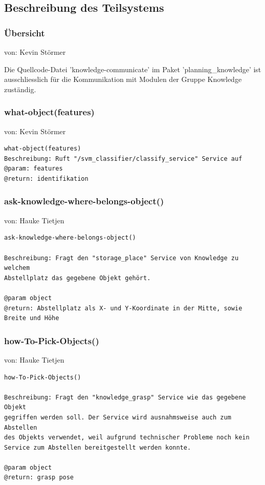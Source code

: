 \documentclass{suturo}
\makeatletter
\newcommand{\chapterauthor}[1]{%
  {\parindent0pt\vspace*{-27pt}%
  \linespread{0}\small\begin{flushright}von: #1\end{flushright}%
  \par\nobreak\vspace*{0pt}}
  \@afterheading%
}
\makeatother
\begin{document}
\subsection{Beschreibung des Teilsystems}
\subsubsection{\"Ubersicht}
\chapterauthor{Kevin Störmer}
Die Quellcode-Datei 'knowledge-communicate' im Paket 'planning\_knowledge' ist ausschliesslich für die Kommunikation mit Modulen der Gruppe Knowledge zust\"andig.

\subsubsection{what-object(features)}
\chapterauthor{Kevin Störmer}
\begin{verbatim}
what-object(features)
Beschreibung: Ruft "/svm_classifier/classify_service" Service auf
@param: features
@return: identifikation
\end{verbatim}

\subsubsection{ask-knowledge-where-belongs-object()}
\chapterauthor{Hauke Tietjen}
\begin{verbatim}
ask-knowledge-where-belongs-object()

Beschreibung: Fragt den "storage_place" Service von Knowledge zu welchem
Abstellplatz das gegebene Objekt gehört.

@param object
@return: Abstellplatz als X- und Y-Koordinate in der Mitte, sowie
Breite und Höhe
\end{verbatim}


\subsubsection{how-To-Pick-Objects()}
\chapterauthor{Hauke Tietjen}
\begin{verbatim}
how-To-Pick-Objects()

Beschreibung: Fragt den "knowledge_grasp" Service wie das gegebene Objekt 
gegriffen werden soll. Der Service wird ausnahmsweise auch zum Abstellen 
des Objekts verwendet, weil aufgrund technischer Probleme noch kein
Service zum Abstellen bereitgestellt werden konnte.

@param object
@return: grasp pose
\end{verbatim}
\end{document}
